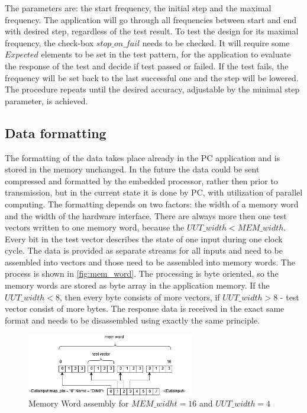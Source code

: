The parameters are: the start frequency, the initial step and the maximal frequency. The application will go through all frequencies between start and end with desired step, regardless of the test result. To test the design for its maximal frequency, the check-box $stop\_on\_fail$ needs to be checked. It will require some $Expected$ elements to be set in the test pattern, for the application to evaluate the response of the test and decide if test passed or failed. If the test fails, the frequency will be set back to the last successful one and the step will be lowered. The procedure repeats until the desired accuracy, adjustable by the minimal step parameter, is achieved.

\subsection{Data formatting}
The formatting of the data takes place already in the PC application and is stored in the memory unchanged. In the future the data could be sent compressed and formatted by the embedded processor, rather then prior to transmission, but in the current state it is done by PC, with utilization of parallel computing. The formatting depends on two factors: the width of a memory word and the width of the hardware interface. There are always more then one test vectors written to one memory word, because the $UUT\_width < MEM\_width$. Every bit in the test vector describes the state of one input during one clock cycle. The data is provided as separate streams for all inputs and need to be assembled into vectors and those need to be assembled into memory words. The process is shown in \autoref{fig:mem_word}. The processing is byte oriented, so the memory words are stored as byte array in the application memory. If the $UUT\_width<8$, then every byte consists of more vectors, if $UUT\_width>8$ - test vector consist of more bytes. The response data is received in the exact same format and needs to be disassembled using exactly the same principle.

\begin{figure}[h]
\centering
\includegraphics[width=0.65\textwidth]{figures/mem_word.png}
\caption{Memory Word assembly for $MEM\_widht = 16$ and $UUT\_width = 4$}
\label{fig:mem_word}
\end{figure}

